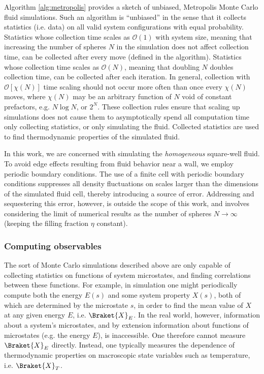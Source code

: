 \documentclass[11pt]{article}
\newcommand{\bk}{\Braket} %
\newcommand{\p}[1]{\left(#1\right)} %
\renewcommand{\sp}[1]{\left[#1\right]} %
\begin{document}
Algorithm \ref{alg:metropolis} provides a sketch of unbiased,
Metropolis Monte Carlo fluid simulations. Such an algorithm is
``unbiased'' in the sense that it collects statistics (i.e. data) on
all valid system configurations with equal probability. Statistics
whose collection time scales as $\mathcal O\p{1}$ with system size,
meaning that increasing the number of spheres $N$ in the simulation
does not affect collection time, can be collected after every move
(defined in the algorithm). Statistics whose collection time scales as
$\mathcal O\p{N}$, meaning that doubling $N$ doubles collection time,
can be collected after each iteration. In general, collection with
$\mathcal O\sp{\chi\p{N}}$ time scaling should not occur more often
than once every $\chi\p{N}$ moves, where $\chi\p{N}$ may be an
arbitrary function of $N$ void of constant prefactors, e.g. $N\log N$,
or $2^N$. These collection rules ensure that scaling up simulations
does not cause them to asymptotically spend all computation time only
collecting statistics, or only simulating the fluid. Collected
statistics are used to find thermodynamic properties of the simulated
fluid.

In this work, we are concerned with simulating the \emph{homogeneous}
square-well fluid. To avoid edge effects resulting from fluid behavior
near a wall, we employ periodic boundary conditions. The use of a
finite cell with periodic boundary conditions suppresses all density
fluctuations on scales larger than the dimensions of the simulated
fluid cell, thereby introducing a source of error. Addressing and
sequestering this error, however, is outside the scope of this work,
and involves considering the limit of numerical results as the number
of spheres $N\to\infty$ (keeping the filling fraction $\eta$
constant).

\subsubsection{Computing observables}
\label{sec:computing_observables}

The sort of Monte Carlo simulations described above are only capable
of collecting statistics on functions of system microstates, and
finding correlations between these functions. For example, in
simulation one might periodically compute both the energy $E\p{s}$ and
some system property $X\p{s}$, both of which are determined by the
microstate $s$, in order to find the mean value of $X$ at any given
energy $E$, i.e. $\bk{X}_E$. In the real world, however, information
about a system's microstates, and by extension information about
functions of microstates (e.g. the energy $E$), is inaccessible. One
therefore cannot measure $\bk{X}_E$ directly. Instead, one typically
measures the dependence of thermodynamic properties on macroscopic
state variables such as temperature, i.e. $\bk{X}_T$.
\end{document}
